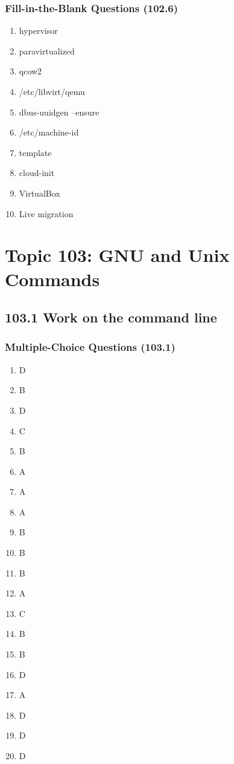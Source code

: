 \documentclass[a4paper]{report}
\begin{document}
\subsubsection*{Fill-in-the-Blank Questions (102.6)}
\begin{enumerate}[1.]
    \item hypervisor
    \item paravirtualized
    \item qcow2
    \item /etc/libvirt/qemu
    \item dbus-uuidgen --ensure
    \item /etc/machine-id
    \item template
    \item cloud-init
    \item VirtualBox
    \item Live migration
\end{enumerate}



\section*{Topic 103: GNU and Unix Commands}


\subsection*{103.1 Work on the command line}
\subsubsection*{Multiple-Choice Questions (103.1)}

\begin{enumerate}[1.]
    \item D
    \item B
    \item D
    \item C
    \item B
    \item A
    \item A
    \item A
    \item B
    \item B
    \item B
    \item A
    \item C
    \item B
    \item B
    \item D
    \item A
    \item D
    \item D
    \item D
\end{enumerate}
\end{document}
